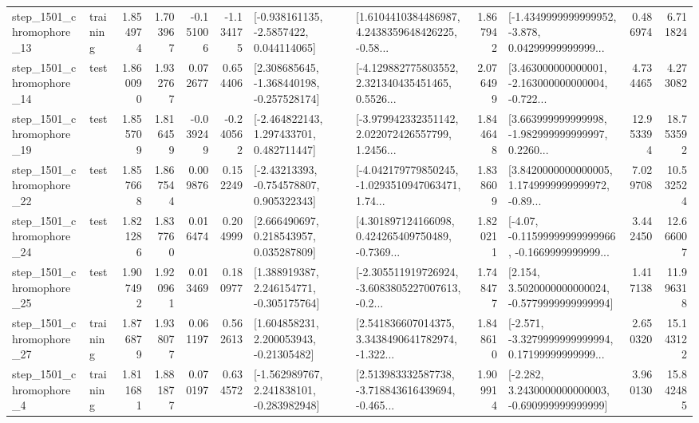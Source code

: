 \begin{tabular}{llrrrrllrlrr}
 step\_1501\_chromophore\_13 &  training &      1.854974 &    1.703967 &     -0.151006 & -1.134175 &     [-0.938161135, -2.5857422, 0.044114065] &  [1.6104410384486987, 4.2438359648426225, -0.58... &       1.867942 &  [-1.4349999999999952, -3.878, 0.04299999999999... &            0.486974 &          6.711824 \\
 step\_1501\_chromophore\_14 &      test &      1.860090 &    1.932767 &      0.072677 &  0.654406 &   [2.308685645, -1.368440198, -0.257528174] &  [-4.129882775803552, 2.321340435451465, 0.5526... &       2.076499 &  [3.463000000000001, -2.163000000000004, -0.722... &            4.734465 &          4.273082 \\
 step\_1501\_chromophore\_19 &      test &      1.855709 &    1.816459 &     -0.039249 & -0.240562 &    [-2.464822143, 1.297433701, 0.482711447] &  [-3.979942332351142, 2.022072426557799, 1.2456... &       1.844648 &  [3.663999999999998, -1.982999999999997, 0.2260... &           12.953394 &         18.753592 \\
 step\_1501\_chromophore\_22 &      test &      1.857668 &    1.867544 &      0.009876 &  0.152249 &    [-2.43213393, -0.754578807, 0.905322343] &  [-4.042179779850245, -1.0293510947063471, 1.74... &       1.838609 &  [3.8420000000000005, 1.1749999999999972, -0.89... &            7.029708 &         10.532524 \\
 step\_1501\_chromophore\_24 &      test &      1.821286 &    1.837760 &      0.016474 &  0.204999 &     [2.666490697, 0.218543957, 0.035287809] &  [4.301897124166098, 0.424265409750489, -0.7369... &       1.820211 &  [-4.07, -0.11599999999999966, -0.1669999999999... &            3.442450 &         12.666007 \\
 step\_1501\_chromophore\_25 &      test &      1.907492 &    1.920961 &      0.013469 &  0.180977 &    [1.388919387, 2.246154771, -0.305175764] &  [-2.305511919726924, -3.6083805227007613, -0.2... &       1.748477 &   [2.154, 3.5020000000000024, -0.5779999999999994] &            1.417138 &         11.996318 \\
 step\_1501\_chromophore\_27 &  training &      1.876879 &    1.938077 &      0.061197 &  0.562613 &     [1.604858231, 2.200053943, -0.21305482] &  [2.541836607014375, 3.3438490641782974, -1.322... &       1.848610 &  [-2.571, -3.3279999999999994, 0.17199999999999... &            2.650320 &         15.143122 \\
  step\_1501\_chromophore\_4 &  training &      1.811681 &    1.881877 &      0.070197 &  0.634572 &   [-1.562989767, 2.241838101, -0.283982948] &  [2.513983332587738, -3.718843616439694, -0.465... &       1.909914 &   [-2.282, 3.2430000000000003, -0.690999999999999] &            3.960130 &         15.842485 \\

\end{tabular}
